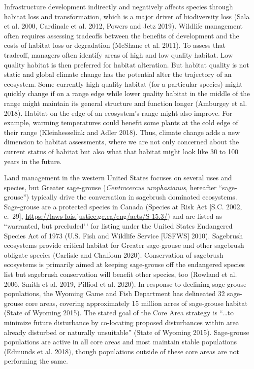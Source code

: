 \documentclass[
  12pt,
]{article}
\begin{document}
Infrastructure development indirectly and negatively affects species through habitat loss and transformation, which is a major driver of biodiversity loss (Sala et al. 2000, Cardinale et al. 2012, Powers and Jetz 2019).
Wildlife management often requires assessing tradeoffs between the benefits of development and the costs of habitat loss or degradation (McShane et al. 2011).
To assess that tradeoff, managers often identify areas of high and low quality habitat.
Low quality habitat is then preferred for habitat alteration.
But habitat quality is not static and global climate change has the potential alter the trajectory of an ecosystem.
Some currently high quality habitat (for a particular species) might quickly change if on a range edge while lower quality habitat in the middle of the range might maintain its general structure and function longer (Amburgey et al. 2018).
Habitat on the edge of an ecosystem's range might also improve.
For example, warming temperatures could benefit some plants at the cold edge of their range (Kleinhesselink and Adler 2018).
Thus, climate change adds a new dimension to habitat assessments, where we are not only concerned about the current status of habitat but also what that habitat might look like 30 to 100 years in the future.

Land management in the western United States focuses on several uses and species, but Greater sage-grouse (\emph{Centrocercus urophasianus}, hereafter ``sage-grouse'') typically drive the conversation in sagebrush dominated ecosystems.
Sage-grouse are a protected species in Canada (Species at Risk Act {[}S.C. 2002, c.~29{]}, \url{https://laws-lois.justice.gc.ca/eng/acts/S-15.3/}) and are listed as ``warranted, but precluded'\,' for listing under the United States Endangered Species Act of 1973 (U.S. Fish and Wildlife Service
{[}USFWS{]} 2010).
Sagebrush ecosystems provide critical habitat for Greater sage-grouse and other sagebrush obligate species (Carlisle and Chalfoun 2020).
Conservation of sagebrush ecosystems is primarily aimed at keeping sage-grouse off the endangered species list but sagebrush conservation will benefit other species, too (Rowland et al. 2006, Smith et al. 2019, Pilliod et al. 2020).
In response to declining sage-grouse populations, the Wyoming Game and Fish Department has delineated 32 sage-grouse core areas, covering approximately 15 million acres of sage-grouse habitat (State of Wyoming 2015).
The stated goal of the Core Area strategy is ``\ldots to minimize future disturbance by co-locating proposed disturbances within area already disturbed or naturally unsuitable'' (State of Wyoming 2015).
Sage-grouse populations are active in all core areas and most maintain stable populations (Edmunds et al. 2018), though populations outside of these core areas are not performing the same.
\end{document}
